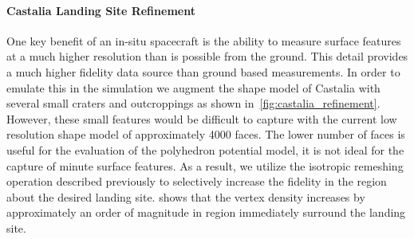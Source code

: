 \paragraph{Castalia Landing Site Refinement}
One key benefit of an in-situ spacecraft is the ability to measure surface features at a much higher resolution than is possible from the ground. 
This detail provides a much higher fidelity data source than ground based measurements. 
In order to emulate this in the simulation we augment the shape model of Castalia with several small craters and outcroppings as shown in~\cref{fig:castalia_refinement}.
However, these small features would be difficult to capture with the current low resolution shape model of approximately \num{4000} faces.
The lower number of faces is useful for the evaluation of the polyhedron potential model, it is not ideal for the capture of minute surface features. 
As a result, we utilize the isotropic remeshing operation described previously to selectively increase the fidelity in the region about the desired landing site.
 shows that the vertex density increases by approximately an order of magnitude in region immediately surround the landing site.
